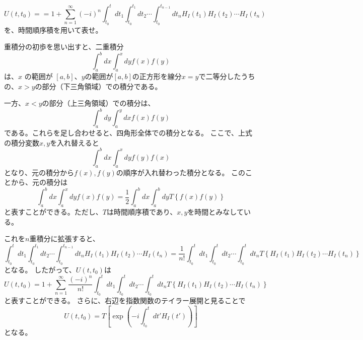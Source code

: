 \dotfill

\[
    U(t, t_0) = = 1 + \sum_{n=1}^{\infty} (-i)^n \int_{t_0}^{t} dt_1 \int_{t_0}^{t_1} dt_2 \cdots \int_{t_0}^{t_{n-1}} dt_n H_{I}(t_1) H_{I}(t_2) \cdots H_{I}(t_n)
\]
を、時間順序積を用いて表せ。

重積分の初歩を思い出すと、二重積分
\[
    \int_{a}^{b} dx \int_{a}^{x} dy f(x) f(y)
\]
は、\(x\) の範囲が \([a, b]\)、\(y\)の範囲が\([a, b]\)の正方形を線分\(x=y\)で二等分したうちの、\(x>y\)の部分（下三角領域）での積分である。

一方、\(x<y\)の部分（上三角領域）での積分は、
\[
    \int_{a}^{b} dy \int_{a}^{y} dx f(x) f(y)
\]
である。これらを足し合わせると、四角形全体での積分となる。
ここで、上式の積分変数\(x, y\)を入れ替えると
\[
    \int_{a}^{b} dx \int_{a}^{x} dy f(y) f(x)
\]
となり、元の積分から\(f(x), f(y)\)の順序が入れ替わった積分となる。
このことから、元の積分は
\[
    \int_{a}^{b} dx \int_{a}^{x} dy f(x) f(y) = \frac{1}{2} \int_{a}^{b} dx \int_{a}^{b} dy T \left\{f(x) f(y)\right\}
\]
と表すことができる。ただし、\(T\)は時間順序積であり、\(x, y\)を時間とみなしている。

これを\(n\)重積分に拡張すると、
\[
    \int_{t_0}^{t} dt_1 \int_{t_0}^{t_1} dt_2 \cdots \int_{t_0}^{t_{n-1}} dt_n H_I(t_1) H_I(t_2) \cdots H_I(t_n) = \frac{1}{n!} \int_{t_0}^{t} dt_1 \int_{t_0}^{t} dt_2 \cdots \int_{t_0}^{t} dt_n T \left\{H_I(t_1) H_I(t_2) \cdots H_I(t_n)\right\}
\]
となる。
したがって、\(U(t, t_0)\)は
\[
    U(t, t_0) = 1 + \sum_{n=1}^{\infty} \frac{(-i)^n}{n!} \int_{t_0}^{t} dt_1 \int_{t_0}^{t} dt_2 \cdots \int_{t_0}^{t} dt_n T \left\{H_I(t_1) H_I(t_2) \cdots H_I(t_n)\right\}
\]
と表すことができる。
さらに、右辺を指数関数のテイラー展開と見ることで
\[
    U(t, t_0) = T\left[ \exp \left( -i \int_{t_0}^{t} dt' H_I(t') \right) \right]
\]
となる。

\dotfill

% 